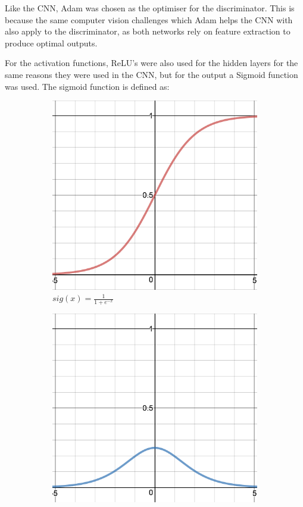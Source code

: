 \documentclass{l4proj}
\begin{document}
Like the CNN, Adam was chosen as the optimiser for the discriminator. This is because the same computer vision challenges which Adam helps the CNN with also apply to the discriminator, as both networks rely on feature extraction to produce optimal outputs. 

For the activation functions, ReLU's were also used for the hidden layers for the same reasons they were used in the CNN, but for the output a Sigmoid function was used. The sigmoid function is defined as:
\begin{figure}[H]
    \centering
    \begin{subfigure}[b]{0.4\textwidth}
        \includegraphics[width=\textwidth]{images/sigmoid.png}
        \caption{$sig(x) = \frac{1}{1+e^{-x}}$}
    \end{subfigure}
    \quad
    \begin{subfigure}[b]{0.4\textwidth}
        \includegraphics[width=\textwidth]{images/sigmoid_prime.png}

\end{subfigure}
\end{figure}
\end{document}

